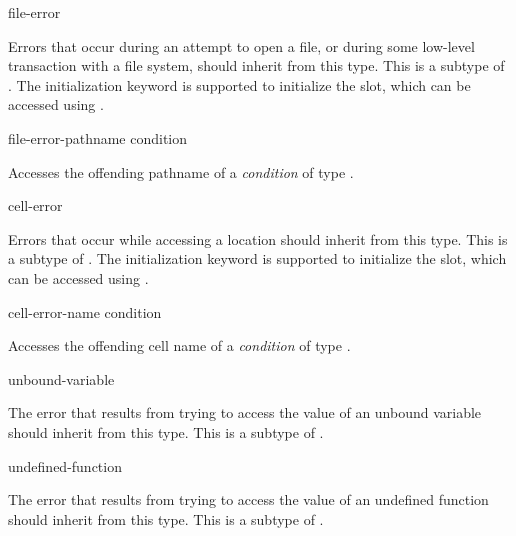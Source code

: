 \begin{defun}[Type]
file-error

  Errors that occur during an attempt to open a file, or during some low-level
  transaction with a file system, should inherit from this type. This is a
  subtype of . The initialization keyword  is supported to initialize the
  slot, which can be accessed using .
\end{defun}

\begin{defun}[Function]
file-error-pathname condition

  Accesses the offending pathname of a {\it condition} of type .
\end{defun}

\begin{defun}[Type]
cell-error

  Errors that occur while accessing a location should inherit from this
  type. This is a subtype of .  The initialization keyword  is supported to 
  initialize the slot, which can be accessed using .
\end{defun}

\begin{defun}[Function]
cell-error-name condition

  Accesses the offending cell name of a {\it condition} of type .
\end{defun}

\begin{defun}[Type]
unbound-variable

  The error that results from trying to access the value of an unbound
  variable should inherit from this type. This is a subtype of .
\end{defun}

\begin{defun}[Type]
undefined-function

  The error that results from trying to access the value of an undefined
  function should inherit from this type. This is a subtype of .
\end{defun}

